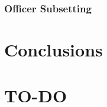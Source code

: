 \documentclass[12pt,letterpaper,toc=flat,oneside]{report}
\theoremstyle{definition}
\theoremstyle{definition}
\theoremstyle{definition}
\theoremstyle{remark}
\begin{document}
\hypertarget{officer-subsetting}{%
\subsection{Officer Subsetting}\label{officer-subsetting}}

\newpage

\hypertarget{conclusions}{%
\chapter{Conclusions}\label{conclusions}}

\hypertarget{to-do}{%
\chapter{TO-DO}\label{to-do}}
\end{document}
